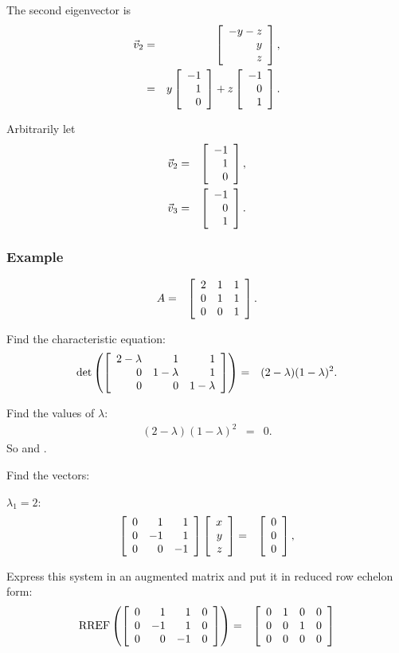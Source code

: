 \begin{frame}

  The second eigenvector is 
  \begin{eqnarray*}
    \vec{v}_2 & = & \left[ \begin{array}{r} -y-z \\ y \\ z \end{array} \right], \\
    & = & y \left[ \begin{array}{r} -1 \\ 1 \\ 0 \end{array} \right] + z \left[ \begin{array}{r} -1 \\ 0 \\ 1 \end{array} \right].
  \end{eqnarray*}

  Arbitrarily let
  \begin{eqnarray*}
    \vec{v}_2 & = & \left[ \begin{array}{r} -1 \\ 1 \\ 0 \end{array} \right], \\
    \vec{v}_3 & = & \left[ \begin{array}{r} -1 \\ 0 \\ 1 \end{array} \right].
  \end{eqnarray*}

\end{frame}

\begin{frame}
  \frametitle{Example}

  \begin{eqnarray*}
    A & = & \left[ \begin{array}{rrr} 2 & 1 & 1 \\ 0 & 1 & 1 \\ 0 & 0 & 1 \end{array} \right].
  \end{eqnarray*}

  {
    Find the characteristic equation:
    \begin{eqnarray*}
      \det\left(\left[ \begin{array}{rrr} 2-\lambda & 1 & 1 \\ 0 & 1-\lambda & 1 \\ 0 & 0 & 1-\lambda \end{array} \right]\right)
      & = & (2-\lambda) (1-\lambda)^2.
    \end{eqnarray*}

    Find the values of $\lambda$:
    \begin{eqnarray*}
      (2-\lambda) (1-\lambda)^2 & = & 0.
    \end{eqnarray*}
    So  and .
  }

\end{frame}


\begin{frame}
  Find the vectors:

  $\lambda_1 = 2$:
  \begin{eqnarray*}
    \left[ \begin{array}{rrr} 0 & 1 & 1 \\ 0 & -1 & 1 \\ 0 & 0 & -1 \end{array} \right]\left[ \begin{array}{r} x \\ y \\ z \end{array} \right] & = & \left[ \begin{array}{r} 0 \\ 0 \\ 0 \end{array} \right], \\
  \end{eqnarray*}

  Express this system in an augmented matrix and put it in reduced row
  echelon form:
  \begin{eqnarray*}
    \mathrm{RREF}\left(\left[ \begin{array}{rrrr}
    0 & 1 & 1 & 0 \\  
    0 & -1 & 1 & 0 \\ 
    0 & 0 & -1 & 0 \\ 
    \end{array} \right]
    \right)
    & = & 
    \left[ \begin{array}{rrrr}
    0 & 1 & 0 & 0 \\  
    0 & 0 & 1 & 0 \\ 
    0 & 0 & 0 & 0 \\ 
    \end{array} \right]
  \end{eqnarray*}


\end{frame}

